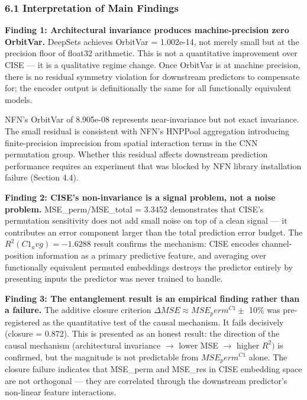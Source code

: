 
\subsubsection{6.1 Interpretation of Main Findings}

\textbf{Finding 1: Architectural invariance produces machine-precision zero OrbitVar.} DeepSets achieves OrbitVar = 1.002e-14, not merely small but at the precision floor of float32 arithmetic. This is not a quantitative improvement over CISE --- it is a qualitative regime change. Once OrbitVar is at machine precision, there is no residual symmetry violation for downstream predictors to compensate for; the encoder output is definitionally the same for all functionally equivalent models.

NFN's OrbitVar of 8.905e-08 represents near-invariance but not exact invariance. The small residual is consistent with NFN's HNPPool aggregation introducing finite-precision imprecision from spatial interaction terms in the CNN permutation group. Whether this residual affects downstream prediction performance requires an experiment that was blocked by NFN library installation failure (Section 4.4).

\textbf{Finding 2: CISE's non-invariance is a signal problem, not a noise problem.} MSE\_perm/MSE\_total = 3.3452 demonstrates that CISE's permutation sensitivity does not add small noise on top of a clean signal --- it contributes an error component larger than the total prediction error budget. The $R^{2}(C1_avg) = -1.6288$ result confirms the mechanism: CISE encodes channel-position information as a primary predictive feature, and averaging over functionally equivalent permuted embeddings destroys the predictor entirely by presenting inputs the predictor was never trained to handle.

\textbf{Finding 3: The entanglement result is an empirical finding rather than a failure.} The additive closure criterion $\Delta MSE \approx MSE_perm^{C1} \pm$ 10\% was pre-registered as the quantitative test of the causal mechanism. It fails decisively (closure = 0.872). This is presented as an honest result: the direction of the causal mechanism (architectural invariance $\rightarrow$ lower MSE $\rightarrow$ higher $R^{2})$ is confirmed, but the magnitude is not predictable from $MSE_perm^{C1}$ alone. The closure failure indicates that MSE\_perm and MSE\_res in CISE embedding space are not orthogonal --- they are correlated through the downstream predictor's non-linear feature interactions.

